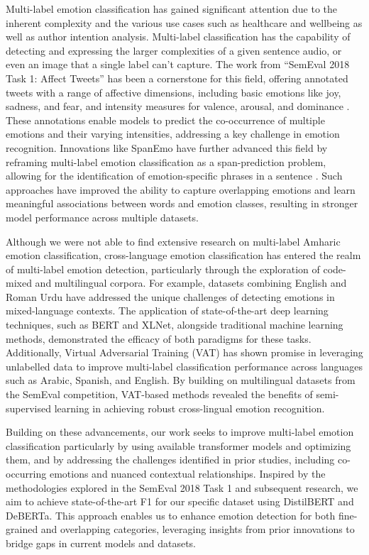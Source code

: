 \documentclass[11pt]{article}
\begin{document}
Multi-label emotion classification has gained significant attention due to the inherent complexity and the various use cases such as healthcare and wellbeing as well as author intention analysis. Multi-label classification has the capability of detecting and expressing the larger complexities of a given sentence audio, or even an image that a single label can’t capture. The work from “SemEval 2018 Task 1: Affect Tweets” has been a cornerstone for this field, offering annotated tweets with a range of affective dimensions, including basic emotions like joy, sadness, and fear, and intensity measures for valence, arousal, and dominance \cite{mohammad-kiritchenko-2018-understanding}. These annotations enable models to predict the co-occurrence of multiple emotions and their varying intensities, addressing a key challenge in emotion recognition. Innovations like SpanEmo have further advanced this field by reframing multi-label emotion classification as a span-prediction problem, allowing for the identification of emotion-specific phrases in a sentence \cite{alhuzali-ananiadou-2021-spanemo}. Such approaches have improved the ability to capture overlapping emotions and learn meaningful associations between words and emotion classes, resulting in stronger model performance across multiple datasets.

Although we were not able to find extensive research on multi-label Amharic emotion classification, cross-language emotion classification has entered the realm of multi-label emotion detection, particularly through the exploration of code-mixed and multilingual corpora. For example, datasets combining English and Roman Urdu have addressed the unique challenges of detecting emotions in mixed-language contexts. The application of state-of-the-art deep learning techniques, such as BERT and XLNet, alongside traditional machine learning methods, demonstrated the efficacy of both paradigms for these tasks. Additionally, Virtual Adversarial Training (VAT)  has shown promise in leveraging unlabelled data to improve multi-label classification performance across languages such as Arabic, Spanish, and English.\cite{gupta-2021-multilingual} By building on multilingual datasets from the SemEval competition, VAT-based methods revealed the benefits of semi-supervised learning in achieving robust cross-lingual emotion recognition.

Building on these advancements, our work seeks to improve multi-label emotion classification particularly by using available transformer models and optimizing them, and by addressing the challenges identified in prior studies, including co-occurring emotions and nuanced contextual relationships. Inspired by the methodologies explored in the SemEval 2018 Task 1 and subsequent research, we aim to achieve state-of-the-art F1 for our specific dataset using DistilBERT and DeBERTa. This approach enables us to enhance emotion detection for both fine-grained and overlapping categories, leveraging insights from prior innovations to bridge gaps in current models and datasets.
\end{document}
